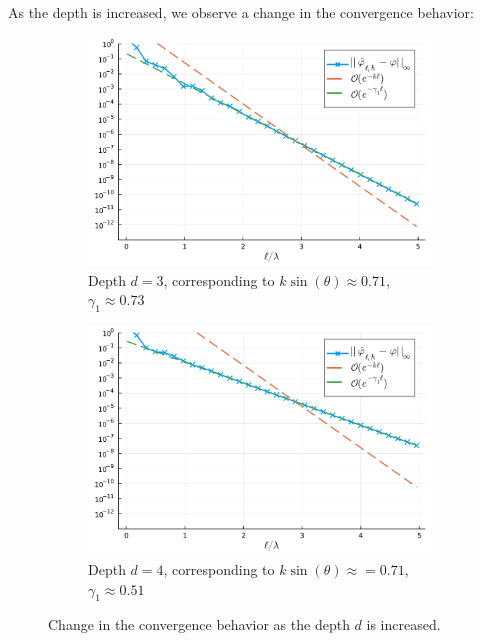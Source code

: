 \documentclass[11pt]{article}
\begin{document}
As the depth is increased, we observe a change in the convergence behavior:

\begin{figure}
  \centering
  \begin{subfigure}{0.49\linewidth}
    \includegraphics[width=\textwidth]{figures/convergence_pml_planewave_depth_3.pdf}
    \caption{Depth $d=3$, corresponding to $k \sin(\theta) \approx 0.71$, $\gamma_1 \approx 0.73$}
    \label{fig:convergence-modal-solution-depth-3}
  \end{subfigure}
  \begin{subfigure}{0.49\linewidth}
    \includegraphics[width=1\textwidth]{figures/convergence_pml_planewave_depth_4.pdf}
    \caption{Depth $d=4$, corresponding to $k \sin(\theta) \approx = 0.71$, $\gamma_1 \approx 0.51$}
    \label{fig:convergence-modal-solution-depth-4}
  \end{subfigure}
  \label{fig:convergence-modal-solution}
  \caption{Change in the convergence behavior as the depth $d$ is increased.}
\end{figure}
\end{document}
